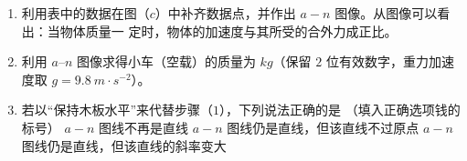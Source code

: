 \begin{enumerate}
\begin{enumerate}
\item 
利用表中的数据在图（$ c $）中补齐数据点，并作出 $ a-n $ 图像。从图像可以看出：当物体质量一
定时，物体的加速度与其所受的合外力成正比。
\banswer{
  
}

\item 
利用 $ a $–$ n $ 图像求得小车（空载）的质量为  $ kg $（保留 $ 2 $ 位有效数字，重力加速度取 $ g=9.8 \ m \cdot s ^{-2}$）。

\item 
若以“保持木板水平”来代替步骤（$ 1 $），下列说法正确的是  （填入正确选项钱的标号）
\threechoices
{$ a - n $ 图线不再是直线}
{$ a - n $ 图线仍是直线，但该直线不过原点}
{$ a - n $ 图线仍是直线，但该直线的斜率变大}

\end{enumerate}



\banswer{

}




\end{enumerate}

